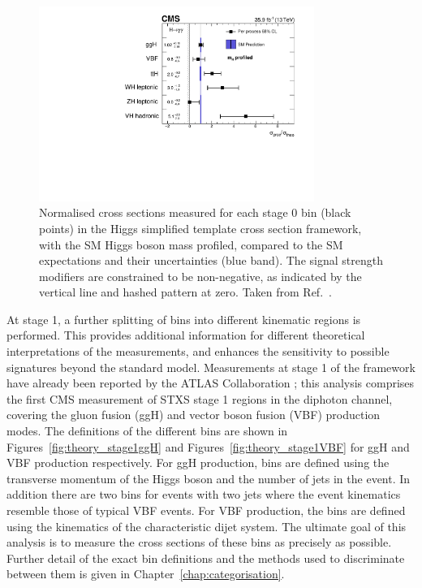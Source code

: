 \begin{figure}[hptb]
  \centering
  \includegraphics[width=0.8\textwidth]{Figures/Theory/PerProcSTXS.pdf}
  \caption[Stage 0 simplified template cross section measurements from Ref.~\cite{HIG-16-040}.]
  {
    Normalised cross sections measured for each stage 0 bin (black points) 
    in the Higgs simplified template cross section framework, 
    with the SM Higgs boson mass profiled, 
    compared to the SM expectations and their uncertainties (blue band). 
    The signal strength modifiers are constrained to be non-negative, 
    as indicated by the vertical line and hashed pattern at zero.
    Taken from Ref.~\cite{HIG-16-040}.
  }
  \label{fig:theory_PerProcSTXS}
\end{figure}

At stage 1, a further splitting of bins into different kinematic regions is performed.
This provides additional information for different theoretical interpretations of the measurements, 
and enhances the sensitivity to possible signatures beyond the standard model.
Measurements at stage 1 of the framework have already been reported by the ATLAS Collaboration \cite{ATLAS_Hgg36,ATLAS_Hgg80,ATLASstage0_ZZ}; 
this analysis comprises the first CMS measurement of STXS stage 1 regions in the diphoton channel, 
covering the gluon fusion (ggH) and vector boson fusion (VBF) production modes.
The definitions of the different bins are shown in 
Figures~\ref{fig:theory_stage1ggH} and Figures~\ref{fig:theory_stage1VBF} 
for ggH and VBF production respectively.
For ggH production, bins are defined using the transverse momentum of the Higgs boson
and the number of jets in the event. 
In addition there are two bins for events with two jets where the event kinematics
resemble those of typical VBF events.
For VBF production, the bins are defined using the kinematics 
of the characteristic dijet system.
The ultimate goal of this analysis is to measure the cross sections of these bins 
as precisely as possible.
Further detail of the exact bin definitions 
and the methods used to discriminate between them is given in Chapter~\ref{chap:categorisation}.

